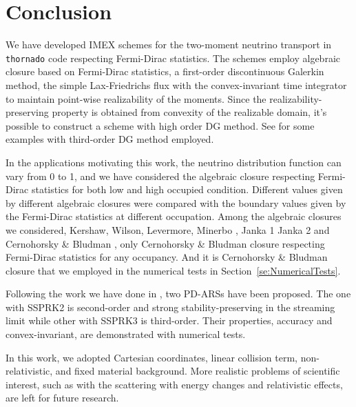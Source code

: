 \section{Conclusion}\label{se:Conclusion}

We have developed IMEX schemes for the two-moment neutrino transport in \texttt{thornado} code respecting Fermi-Dirac statistics.
The schemes employ algebraic closure based on Fermi-Dirac statistics, a first-order discontinuous Galerkin method, the simple Lax-Friedrichs flux with the convex-invariant time integrator to maintain point-wise realizability of the moments.
Since the realizability-preserving property is obtained from convexity of the realizable domain, it's possible to construct a scheme with high order DG method.
See \cite{chu_2018} for some examples with third-order DG method employed.

In the applications motivating this work, the neutrino distribution function can vary from 0 to 1, and we have considered the algebraic closure respecting Fermi-Dirac statistics for both low and high occupied condition.
Different values given by different algebraic closures were compared with the boundary values given by the Fermi-Dirac statistics at different occupation.
Among the algebraic closures we considered, Kershaw\cite{kershaw_1976}, Wilson\cite{wilson1975,leblanc1970}, Levermore\cite{levermore_1984}, Minerbo \cite{minerbo_1978}, Janka 1\cite{janka1991} Janka 2\cite{janka1992} and Cernohorsky \& Bludman \cite{cernohorskyBludman_1994}, only Cernohorsky \& Bludman closure respecting Fermi-Dirac statistics for any occupancy.
And it is Cernohorsky \& Bludman closure that we employed in the numerical tests in Section~\ref{se:NumericalTests}.

Following the work we have done in \cite{chu_2018}, two PD-ARSs have been proposed.
The one with SSPRK2 is second-order and strong stability-preserving in the streaming limit while other with SSPRK3 is third-order.
Their properties, accuracy and convex-invariant, are demonstrated with numerical tests.

In this work, we adopted Cartesian coordinates, linear collision term, non-relativistic, and fixed material background.
More realistic problems of scientific interest, such as with the scattering with energy changes and relativistic effects, are left for future research.
